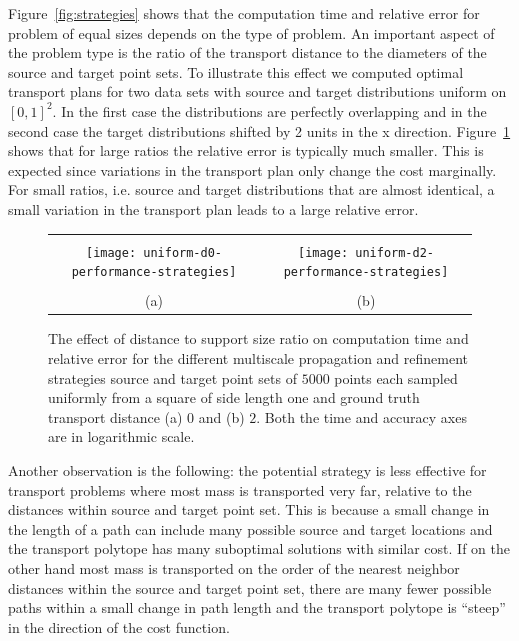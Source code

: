\documentclass[twoside,11pt]{article}
\begin{document}
Figure~\ref{fig:strategies} shows that the computation time and relative
error for problem of equal sizes depends on the type of problem. An important
aspect of the problem type is the ratio of the transport distance to the diameters
of the source and target point sets. To illustrate this effect we computed
optimal transport plans for two data sets with source and target
distributions uniform on $[0,1]^2$. In the first case the distributions are
perfectly overlapping and in the second case the target distributions shifted
by 2 units in the x direction.  Figure~\ref{fig:distance-strategies} shows that
for large ratios the relative error is typically much smaller.  This is
expected since variations in the transport plan only change the cost
marginally. For small ratios, i.e.  source and target distributions that are
almost identical, a small variation in the transport plan leads to a large
relative error.
\begin{figure}[htb]
\centering
\begin{tabular}{cc}
                       \vspace{-0.3in} \\
\texttt{[image: uniform-d0-performance-strategies]} &
\texttt{[image: uniform-d2-performance-strategies]} \\
                       \vspace{-0.2in} \\
                       (a) & (b)  
\end{tabular}
  \vspace{-0.15in}
\caption{
\label{fig:distance-strategies}
The effect of distance to support size ratio on computation time and relative
error for the different multiscale propagation and refinement strategies source
and target point sets of $5000$ points each sampled uniformly from a square of
side length one and ground truth transport distance (a) $0$ and (b) $2$.  Both
the time and accuracy axes are in logarithmic scale.  } 
\end{figure}
Another observation is the following: the potential strategy is less effective
for transport problems where most mass is transported very far, relative to the
distances within source and target point set. This is because a small change in
the length of a path can include many possible source and target locations and
the transport polytope has many suboptimal solutions with similar cost. If on
the other hand most mass is transported on the order of the nearest neighbor
distances within the source and target point set, there are many fewer possible
paths within a small change in path length and the transport polytope is
``steep'' in the direction of the cost function. 
\end{document}
